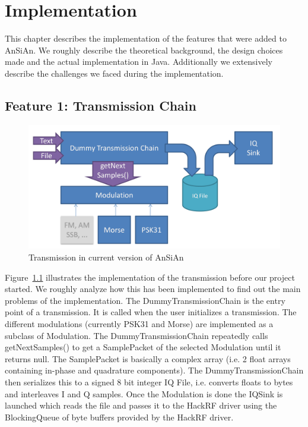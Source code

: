 
\chapter{Implementation}

This chapter describes the implementation of the features that were added to \ac{AnSiAn}. We roughly describe the theoretical background, the design choices made and the actual implementation in Java. Additionally we extensively describe the challenges we faced during the implementation. 

\section{Feature 1: Transmission Chain}


\begin{figure}
	\centering
	\includegraphics[width=1\linewidth]{gfx/TX_chain_step2.png}
	\caption{Transmission in current version of AnSiAn \cite{Mantz2016}}
	\label{fig:tx_chain_old2}
\end{figure}


Figure~\ref{fig:tx_chain_old2} illustrates the implementation of the transmission before our project started. We roughly analyze how this has been implemented to find out the main problems of the implementation. The DummyTransmissionChain is the entry point of a transmission. It is called when the user initializes a transmission. The different modulations (currently PSK31 and Morse) are implemented as a subclass of Modulation. The DummyTransmissionChain repeatedly calls getNextSamples() to get a SamplePacket of the selected Modulation until it returns null. The SamplePacket is basically a complex array (i.e. 2 float arrays containing in-phase and quadrature components). The DummyTransmissionChain then serializes this to a signed 8 bit integer IQ File, i.e. converts floats to bytes and interleaves I and Q samples. Once the Modulation is done the IQSink is launched which reads the file and passes it to the HackRF driver using the BlockingQueue of byte buffers provided by the HackRF driver. 

